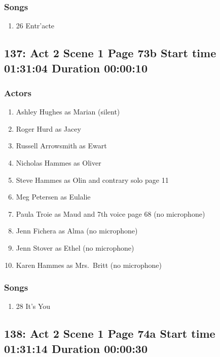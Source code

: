 \subsubsection{Songs}
\begin{enumerate}
\item 26 Entr'acte
\end{enumerate}
\subsection{137: Act 2 Scene 1 Page 73b Start time 01:31:04 Duration 00:00:10}

\subsubsection{Actors}
\begin{enumerate}
\item Ashley Hughes as Marian (silent)
\item Roger Hurd as Jacey
\item Russell Arrowsmith as Ewart
\item Nicholas Hammes as Oliver
\item Steve Hammes as Olin and contrary solo page 11
\item Meg Petersen as Eulalie
\item Paula Troie as Maud and 7th voice page 68 (no microphone)
\item Jenn Fichera as Alma (no microphone)
\item Jenn Stover as Ethel (no microphone)
\item Karen Hammes as Mrs.~Britt (no microphone)
\end{enumerate}

\subsubsection{Songs}
\begin{enumerate}
\item 28 It's You
\end{enumerate}
\subsection{138: Act 2 Scene 1 Page 74a Start time 01:31:14 Duration 00:00:30}

